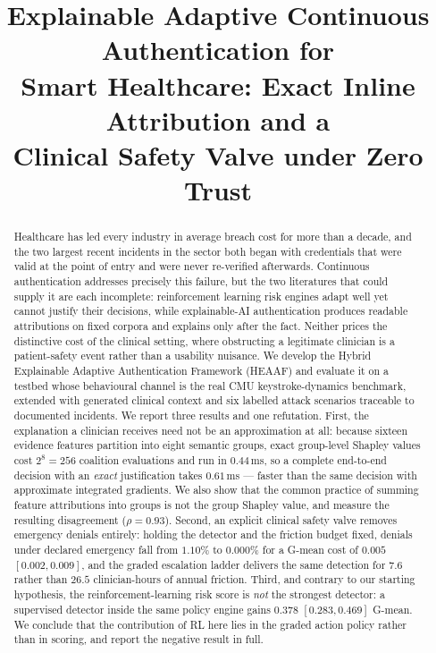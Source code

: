 \documentclass[conference]{IEEEtran}
\begin{document}
\title{Explainable Adaptive Continuous Authentication for\\
Smart Healthcare: Exact Inline Attribution and a\\
Clinical Safety Valve under Zero Trust}

\author{
}

\maketitle

\begin{abstract}
Healthcare has led every industry in average breach cost for more than a
decade, and the two largest recent incidents in the sector both began with
credentials that were valid at the point of entry and were never re-verified
afterwards. Continuous authentication addresses precisely this failure, but
the two literatures that could supply it are each incomplete: reinforcement
learning risk engines adapt well yet cannot justify their decisions, while
explainable-AI authentication produces readable attributions on fixed corpora
and explains only after the fact. Neither prices the distinctive cost of the
clinical setting, where obstructing a legitimate clinician is a patient-safety
event rather than a usability nuisance. We develop the Hybrid Explainable
Adaptive Authentication Framework (HEAAF) and evaluate it on a testbed whose
behavioural channel is the real CMU keystroke-dynamics benchmark, extended
with generated clinical context and six labelled attack scenarios traceable to
documented incidents. We report three results and one refutation. First, the
explanation a clinician receives need not be an approximation at all: because
sixteen evidence features partition into eight semantic groups, exact
group-level Shapley values cost $2^{8}=256$ coalition evaluations and run in
$0.44$\,ms, so a complete end-to-end decision with an \emph{exact} justification
takes $0.61$\,ms --- faster than the same decision with approximate integrated
gradients. We also show that the common practice of summing feature
attributions into groups is not the group Shapley value, and measure the
resulting disagreement ($\rho=0.93$). Second, an explicit clinical safety valve
removes emergency denials entirely: holding the detector and the friction
budget fixed, denials under declared emergency fall from $1.10\%$ to
$0.000\%$ for a G-mean cost of $0.005$ $[0.002, 0.009]$, and the graded
escalation ladder delivers the same detection for $7.6$ rather than $26.5$
clinician-hours of annual friction. Third, and contrary to our starting
hypothesis, the reinforcement-learning risk score is \emph{not} the strongest
detector: a supervised detector inside the same policy engine gains $0.378$
$[0.283,0.469]$ G-mean. We conclude that the contribution of RL here lies in
the graded action policy rather than in scoring, and report the negative result
in full.
\end{abstract}
\end{document}
